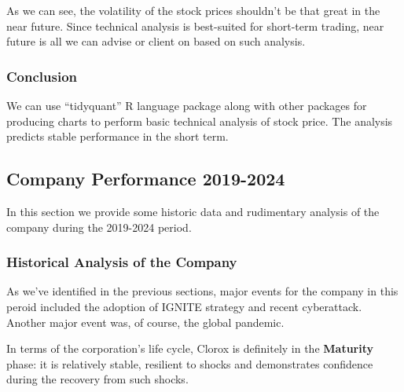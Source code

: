 \documentclass[
  letterpaper,
  DIV=11,
  numbers=noendperiod]{scrartcl}
\begin{document}
As we can see, the volatility of the stock prices shouldn't be that
great in the near future. Since technical analysis is best-suited for
short-term trading, near future is all we can advise or client on based
on such analysis.

\subsubsection{\texorpdfstring{\textbf{Conclusion}}{Conclusion}}\label{conclusion-3}

We can use ``tidyquant'' R language package along with other packages
for producing charts to perform basic technical analysis of stock price.
The analysis predicts stable performance in the short term.

\subsection{Company Performance
2019-2024}\label{company-performance-2019-2024}

\begin{tcolorbox}[enhanced jigsaw, left=2mm, colback=white, opacityback=0, coltitle=black, arc=.35mm, leftrule=.75mm, bottomrule=.15mm, colbacktitle=quarto-callout-note-color!10!white, toptitle=1mm, title=\textcolor{quarto-callout-note-color}{\faInfo}\hspace{0.5em}{Note}, opacitybacktitle=0.6, bottomtitle=1mm, titlerule=0mm, breakable, rightrule=.15mm, toprule=.15mm, colframe=quarto-callout-note-color-frame]

In this section we provide some historic data and rudimentary analysis
of the company during the 2019-2024 period.

\end{tcolorbox}

\subsubsection{\texorpdfstring{\textbf{Historical Analysis of the
Company}}{Historical Analysis of the Company}}\label{historical-analysis-of-the-company}

As we've identified in the previous sections, major events for the
company in this peroid included the adoption of IGNITE strategy and
recent cyberattack. Another major event was, of course, the global
pandemic.

In terms of the corporation's life cycle, Clorox is definitely in the
\textbf{Maturity} phase: it is relatively stable, resilient to shocks
and demonstrates confidence during the recovery from such shocks.
\end{document}
